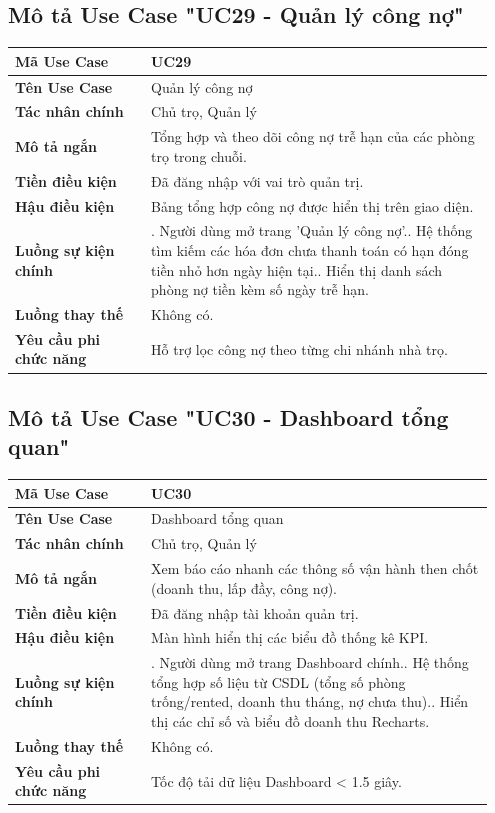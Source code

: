\subsection{Mô tả Use Case "UC29 - Quản lý công nợ"}

\begin{longtable}[]{@{}>{\RaggedRight\arraybackslash}p{0.27\linewidth}>{\RaggedRight\arraybackslash}p{0.68\linewidth}@{}}
\toprule
\textbf{Mã Use Case} & UC29\tabularnewline
\midrule
\endhead
\textbf{Tên Use Case} & Quản lý công nợ\tabularnewline
\textbf{Tác nhân chính} & Chủ trọ, Quản lý\tabularnewline
\textbf{Mô tả ngắn} & Tổng hợp và theo dõi công nợ trễ hạn của các phòng
trọ trong chuỗi.\tabularnewline
\textbf{Tiền điều kiện} & Đã đăng nhập với vai trò quản
trị.\tabularnewline
\textbf{Hậu điều kiện} & Bảng tổng hợp công nợ được hiển thị trên giao
diện.\tabularnewline
\textbf{Luồng sự kiện chính} & 1. Người dùng mở trang
'Quản lý công nợ'.\newline 2. Hệ thống tìm kiếm các hóa đơn chưa
thanh toán có hạn đóng tiền nhỏ hơn ngày hiện tại.\newline 3. Hiển
thị danh sách phòng nợ tiền kèm số ngày trễ hạn.\tabularnewline
\textbf{Luồng thay thế} & Không có.\tabularnewline
\textbf{Yêu cầu phi chức năng} & Hỗ trợ lọc công nợ theo từng chi nhánh
nhà trọ.\tabularnewline
\bottomrule
\end{longtable}

\subsection{Mô tả Use Case "UC30 - Dashboard tổng quan"}

\begin{longtable}[]{@{}>{\RaggedRight\arraybackslash}p{0.27\linewidth}>{\RaggedRight\arraybackslash}p{0.68\linewidth}@{}}
\toprule
\textbf{Mã Use Case} & UC30\tabularnewline
\midrule
\endhead
\textbf{Tên Use Case} & Dashboard tổng quan\tabularnewline
\textbf{Tác nhân chính} & Chủ trọ, Quản lý\tabularnewline
\textbf{Mô tả ngắn} & Xem báo cáo nhanh các thông số vận hành then chốt
(doanh thu, lấp đầy, công nợ).\tabularnewline
\textbf{Tiền điều kiện} & Đã đăng nhập tài khoản quản
trị.\tabularnewline
\textbf{Hậu điều kiện} & Màn hình hiển thị các biểu đồ thống kê
KPI.\tabularnewline
\textbf{Luồng sự kiện chính} & 1. Người dùng mở trang
Dashboard chính.\newline 2. Hệ thống tổng hợp số liệu từ CSDL (tổng
số phòng trống/rented, doanh thu tháng, nợ chưa thu).\newline 3.
Hiển thị các chỉ số và biểu đồ doanh thu Recharts.\tabularnewline
\textbf{Luồng thay thế} & Không có.\tabularnewline
\textbf{Yêu cầu phi chức năng} & Tốc độ tải dữ liệu Dashboard
\textless{} 1.5 giây.\tabularnewline
\bottomrule
\end{longtable}

